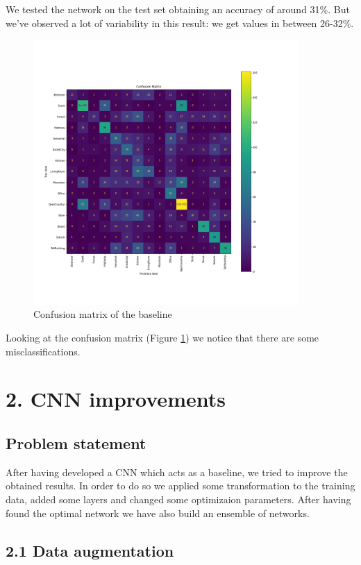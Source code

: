 \documentclass[12pt, a4paper]{report}
\begin{document}
We tested the network on the test set obtaining an accuracy of around 31\%. But we've observed a lot of variability in this result: we get values in between 26-32\%. 

\begin{figure}[h!]
	\centering
	\includegraphics[width=0.9\textwidth]{img/baselineConf}
	\caption{Confusion matrix of the baseline}
	\label{fig:baselinecmatrix}
\end{figure}

Looking at the confusion matrix (Figure \ref{fig:baselinecmatrix}) we notice that there are some misclassifications.

\section*{2. CNN improvements}

\subsection*{Problem statement}
After having developed a CNN which acts as a baseline, we tried to improve the obtained results. In order to do so we applied some transformation to the training data, added some layers and changed some optimizaion parameters. After having found the optimal network we have also build an ensemble of networks.

\subsection*{2.1 Data augmentation}
\end{document}
